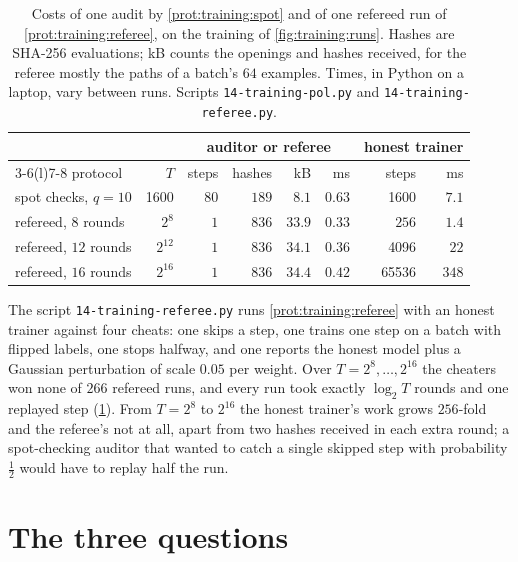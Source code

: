 \begin{refsection}
\begin{table}[t]
\centering\small
\begin{tabular}{@{}l r r r r r r r@{}}
\toprule
& & \multicolumn{4}{c}{auditor or referee} & \multicolumn{2}{c}{honest trainer}\\
\cmidrule(lr){3-6}\cmidrule(l){7-8}
protocol & $T$ & steps & hashes & kB & ms & steps & ms\\
\midrule
spot checks, $q=10$ & \num{1600} & $80$ & $189$ & $8.1$ & $0.63$ & \num{1600} & $7.1$\\
refereed, $8$ rounds & $2^{8}$ & $1$ & $836$ & $33.9$ & $0.33$ & $256$ & $1.4$\\
refereed, $12$ rounds & $2^{12}$ & $1$ & $836$ & $34.1$ & $0.36$ & \num{4096} & $22$\\
refereed, $16$ rounds & $2^{16}$ & $1$ & $836$ & $34.4$ & $0.42$ & \num{65536} & $348$\\
\bottomrule
\end{tabular}
\caption{Costs of one audit by \cref{prot:training:spot} and of one refereed run of \cref{prot:training:referee}, on the training of \cref{fig:training:runs}. Hashes are SHA-256 evaluations; kB counts the openings and hashes received, for the referee mostly the paths of a batch's $64$ examples. Times, in Python on a laptop, vary between runs. Scripts \texttt{14-training-pol.py} and \texttt{14-training-referee.py}.}\label{tab:training:costs}
\end{table}

The script \texttt{14-training-referee.py} runs \cref{prot:training:referee} with an honest trainer against four cheats: one skips a step, one trains one step on a batch with flipped labels, one stops halfway, and one reports the honest model plus a Gaussian perturbation of scale $0.05$ per weight. Over $T=2^8,\dots,2^{16}$ the cheaters won none of $266$ refereed runs, and every run took exactly $\log_2T$ rounds and one replayed step (\cref{tab:training:costs}). From $T=2^8$ to $2^{16}$ the honest trainer's work grows $256$-fold and the referee's not at all, apart from two hashes received in each extra round; a spot-checking auditor that wanted to catch a single skipped step with probability $\frac12$ would have to replay half the run.

\section{The three questions}\label{sec:training:questions}


\end{refsection}
